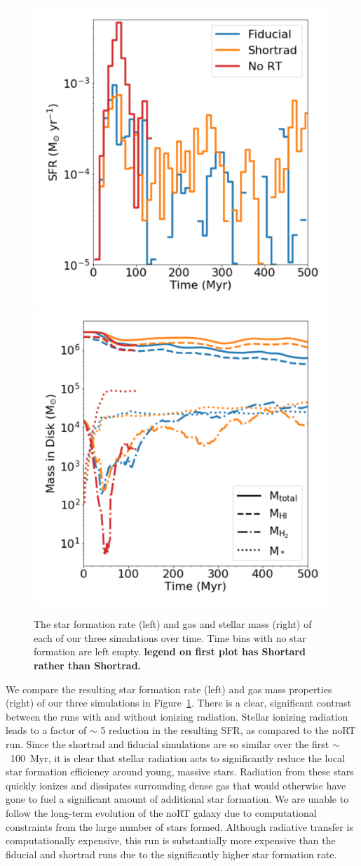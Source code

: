 \documentclass[twocolumn]{aastex62}
\begin{document}
\begin{figure}
\centering
\includegraphics[width=0.49\linewidth]{sfr}
\includegraphics[width=0.49\linewidth]{mass}
\caption{The star formation rate (left) and gas and stellar mass (right) of each of our three simulations over time.
   Time bins with no star formation are left empty. 
   {\bf legend on first plot has Shortard rather than Shortrad.}}
\label{fig:sfr_mass_evolution}
\end{figure}

We compare the resulting star formation rate (left) and gas mass properties (right) of our three simulations in Figure~\ref{fig:sfr_mass_evolution}. There is a clear, significant contrast between the runs with and without ionizing radiation. Stellar ionizing radiation leads to a factor of $\sim$ 5 reduction in the resulting SFR, as compared to the noRT run. Since the shortrad and fiducial simulations are so similar over the first $\sim$~100~Myr, it is clear that stellar radiation acts to significantly reduce the local star formation efficiency around young, massive stars. Radiation from these stars quickly ionizes and dissipates surrounding dense gas that would otherwise have gone to fuel a significant amount of additional star formation. We are unable to follow the long-term evolution of the noRT galaxy due to computational constraints 
   from the large number of stars formed. 
Although radiative transfer is computationally expensive, this run is substantially more expensive than the fiducial and shortrad runs due to the significantly higher star formation rate.
\end{document}
